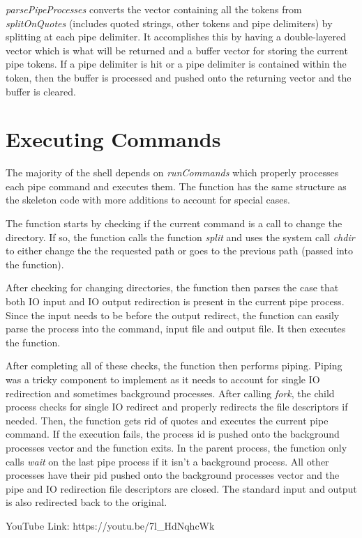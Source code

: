 \documentclass[12pt]{article}
\newcommand\tab[1][0.7cm]{\hspace*{#1}}
\begin{document}
\emph{parsePipeProcesses} converts the vector containing all the tokens from \emph{splitOnQuotes} (includes quoted strings, other tokens and pipe delimiters) by splitting at each pipe delimiter. It accomplishes this by having a double-layered vector which is what will be returned and a buffer vector for storing the current pipe tokens. If a pipe delimiter is hit or a pipe delimiter is contained within the token, then the buffer is processed and pushed onto the returning vector and the buffer is cleared. 

\section{Executing Commands}

\tab The majority of the shell depends on \emph{runCommands} which properly processes each pipe command and executes them. The function has the same structure as the skeleton code with more additions to account for special cases. 

The function starts by checking if the current command is a call to change the directory. If so, the function calls the function \emph{split} and uses the system call \emph{chdir} to either change the the requested path or goes to the previous path (passed into the function). 

After checking for changing directories, the function then parses the case that both IO input and IO output redirection is present in the current pipe process. Since the input needs to be before the output redirect, the function can easily parse the process into the command, input file and output file. It then executes the function. 

After completing all of these checks, the function then performs piping. Piping was a tricky component to implement as it needs to account for single IO redirection and sometimes background processes. After calling \emph{fork}, the child process checks for single IO redirect and properly redirects the file descriptors if needed. Then, the function gets rid of quotes and executes the current pipe command. If the execution fails, the process id is pushed onto the background processes vector and the function exits. In the parent process, the function only calls \emph{wait} on the last pipe process if it isn't a background process. All other processes have their pid pushed onto the background processes vector and the pipe and IO redirection file descriptors are closed. The standard input and output is also redirected back to the original. 

YouTube Link: https://youtu.be/7l\_HdNqhcWk
\end{document}
